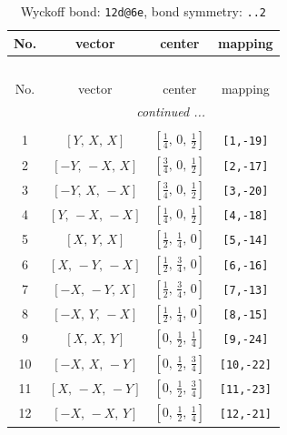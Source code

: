 \documentclass[fleqn,8pt]{jsarticle}
\begin{document}
\begin{longtable}{cccc}
\caption{Wyckoff bond: {\tt 12d@6e}, bond symmetry: {\tt ..2}}
 \\
 \hline \hline
No. & vector & center & mapping \\ \hline \endfirsthead

\multicolumn{3}{l}{\tablename\ \thetable{}} \\
 \hline \hline
No. & vector & center & mapping \\ \hline \endhead

 \hline \hline
\multicolumn{3}{r}{\footnotesize\it continued ...} \\ \endfoot

 \hline \hline
\multicolumn{3}{r}{} \\ \endlastfoot

1 & $\left[ Y,\, X,\, X \right]$ & $\left[ \frac{1}{4},\, 0,\, \frac{1}{2} \right]$ & {\tt [1,-19]} \\ \hline
2 & $\left[ - Y,\, - X,\, X \right]$ & $\left[ \frac{3}{4},\, 0,\, \frac{1}{2} \right]$ & {\tt [2,-17]} \\ \hline
3 & $\left[ - Y,\, X,\, - X \right]$ & $\left[ \frac{3}{4},\, 0,\, \frac{1}{2} \right]$ & {\tt [3,-20]} \\ \hline
4 & $\left[ Y,\, - X,\, - X \right]$ & $\left[ \frac{1}{4},\, 0,\, \frac{1}{2} \right]$ & {\tt [4,-18]} \\ \hline
5 & $\left[ X,\, Y,\, X \right]$ & $\left[ \frac{1}{2},\, \frac{1}{4},\, 0 \right]$ & {\tt [5,-14]} \\ \hline
6 & $\left[ X,\, - Y,\, - X \right]$ & $\left[ \frac{1}{2},\, \frac{3}{4},\, 0 \right]$ & {\tt [6,-16]} \\ \hline
7 & $\left[ - X,\, - Y,\, X \right]$ & $\left[ \frac{1}{2},\, \frac{3}{4},\, 0 \right]$ & {\tt [7,-13]} \\ \hline
8 & $\left[ - X,\, Y,\, - X \right]$ & $\left[ \frac{1}{2},\, \frac{1}{4},\, 0 \right]$ & {\tt [8,-15]} \\ \hline
9 & $\left[ X,\, X,\, Y \right]$ & $\left[ 0,\, \frac{1}{2},\, \frac{1}{4} \right]$ & {\tt [9,-24]} \\ \hline
10 & $\left[ - X,\, X,\, - Y \right]$ & $\left[ 0,\, \frac{1}{2},\, \frac{3}{4} \right]$ & {\tt [10,-22]} \\ \hline
11 & $\left[ X,\, - X,\, - Y \right]$ & $\left[ 0,\, \frac{1}{2},\, \frac{3}{4} \right]$ & {\tt [11,-23]} \\ \hline
12 & $\left[ - X,\, - X,\, Y \right]$ & $\left[ 0,\, \frac{1}{2},\, \frac{1}{4} \right]$ & {\tt [12,-21]} \\
\end{longtable}
\end{document}
